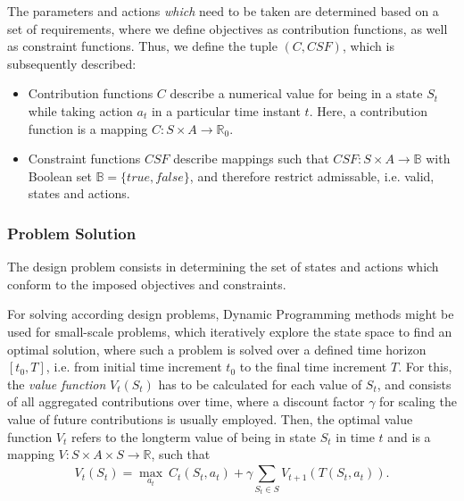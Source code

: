 \documentclass[a4paper,twoside]{article}
\begin{document}
	The parameters and actions \textit{which} need to be taken are determined based on a set of requirements, where we define objectives as contribution functions, as well as constraint functions. Thus, we define the tuple $(C, CSF)$, which is subsequently described:
	
	\begin{itemize}
		\item Contribution functions $C$ describe a numerical value for being in a state $S_{t}$ while taking action $a_{t}$ in a particular time instant $t$. Here, a contribution function is a mapping $C : S \times A \to \mathbb{R}_0$.
		\item Constraint functions $CSF$ describe mappings such that $CSF : S \times A \to \mathbb{B}$ with Boolean set $\mathbb{B} = \{\mathit{true},\mathit{false}\}$, and therefore restrict admissable, i.e. valid, states and actions. 
	\end{itemize}
	
	\subsubsection{Problem Solution}
	The design problem consists in determining the set of states and actions which conform to the imposed objectives and constraints. 
	
	For solving according design problems, Dynamic Programming \cite{bellman_dynamic_1957} methods might be used for small-scale problems, which iteratively explore the state space to find an optimal solution, where such a problem is solved over a defined time horizon $[t_0,T]$, i.e. from initial time increment $t_0$ to the final time increment $T$. For this, the \textit{value function} $V_t(S_t)$ has to be calculated for each value of $S_t$, and consists of all aggregated contributions over time, where a discount factor $\gamma$ for scaling the value of future contributions is usually employed. Then, the optimal value function $V_t$ refers to the longterm value of being in state $S_t$ in time $t$ and is a mapping $V : S \times A \times S \to \mathbb{R}$, such that
	\begin{equation}
		V_t(S_t) = \max_{a_t}\ C_t(S_t,a_t) + \gamma \sum_{S_t \in S}^{}V_{t+1}(T(S_t,a_t)) \mathrm{.}
	\end{equation}
	
\end{document}
